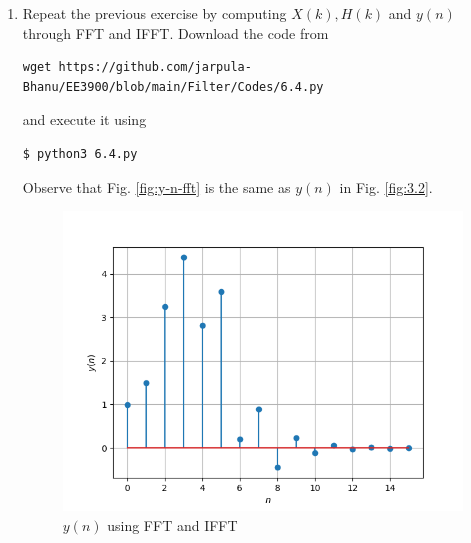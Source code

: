 \documentclass[journal,12pt,twocolumn]{IEEEtran}
\renewcommand\thesection{\arabic{section}}
\begin{document}
\begin{enumerate}[label=\thesection.\arabic*
,ref=\thesection.\theenumi]
\item Repeat the previous exercise by computing $X(k), H(k)$ and $y(n)$ through FFT and 
 IFFT.
 \solution Download the code from
\begin{lstlisting}
wget https://github.com/jarpula-Bhanu/EE3900/blob/main/Filter/Codes/6.4.py
\end{lstlisting}
and execute it using
\begin{lstlisting}
$ python3 6.4.py
\end{lstlisting}
Observe that Fig. \eqref{fig:y-n-fft} is the same as $y(n)$ in Fig. \eqref{fig:3.2}.
\begin{figure}
\centering
\includegraphics[width=\columnwidth]{figs/6.4.png}
\caption{$y(n)$ using FFT and IFFT}
\label{fig:y-n-fft}
\end{figure}

\end{enumerate}
\end{document}
